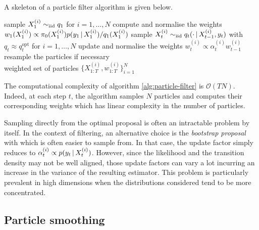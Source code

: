 A skeleton of a particle filter algorithm is given below.
%
\begin{algorithm}[!h]\small
	\caption{\label{alg:particle-filter}}
	\begin{algorithmic}[1]
		\State sample $X_{1}^{(i)}\sim_{\mathrm{iid}} q_{1}$ for $i=1,\dots,N$	%
		\State compute and normalise the weights $w_{1}(X^{(i)}_{1})\propto {\pi_{0}( X^{(i)}_{1})p(y_{1}\,|\,X^{(i)}_{1})/ q_{1}(X^{(i)}_{1})}$
			\State sample $X^{(i)}_{t}\sim_{\mathrm{iid}} q_{t}( \cdot \,|\, X^{(i)}_{t-1}, y_{t})$ with $q_{t}\approx q_{t}^{\text{opt}}$ for $i=1,\dots,N$
			\State update and normalise the weights $w^{(i)}_{t}\propto\alpha^{(i)}_{t}w^{(i)}_{t-1}$
			\State resample the particles if necessary
		\EndFor\\
		\Return weighted set of particles $\{X^{(i)}_{1:T},w^{(i)}_{1:T}\}_{i=1}^{N}$
	\end{algorithmic}
\end{algorithm}
%

The computational complexity of algorithm \ref{alg:particle-filter} is $\mathcal O(TN)$. Indeed, at each step $t$,  the algorithm samples $N$ particles and computes their corresponding weights which has linear complexity in the number of particles.

Sampling directly from the optimal proposal is often an intractable problem by itself. In the context of filtering, an alternative choice is the \emph{bootstrap proposal} \citep{doucet11} with
which is often easier to sample from. In that case, the update factor simply reduces to $\alpha^{(i)}_t \propto p(y_t\,|\, X^{(i)}_t)$. However, since the likelihood and the transition density may not be well aligned, those update factors can vary a lot incurring an increase in the variance of the resulting estimator.
This problem is particularly prevalent in high dimensions when the distributions considered tend to be more concentrated.


\subsection{\label{bg:particle-smoothing}Particle smoothing}

